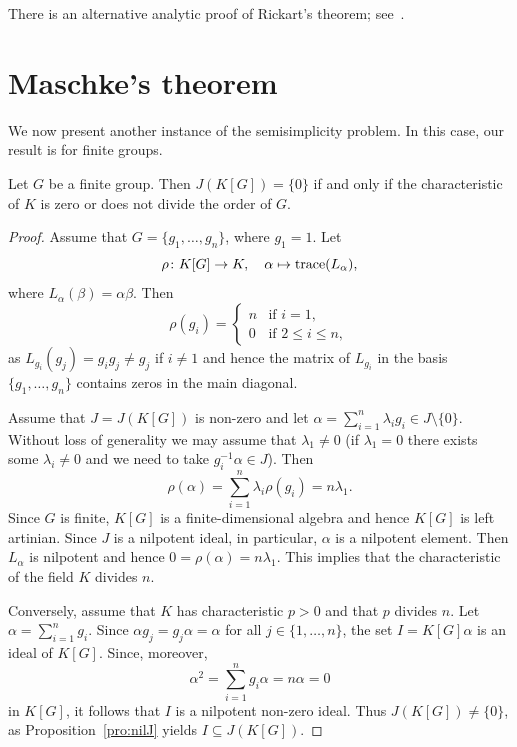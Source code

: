 
\project
There is an alternative analytic 
proof of Rickart's theorem; see~\cite{MR1838439}.

\section{Maschke's theorem}
\lecture 

We now present another instance of the semisimplicity problem.
In this case, our result is for finite groups. 

\begin{theorem}[Maschke]
	Let $G$ be a finite group. Then $J(K[G])=\{0\}$ if and only 
	if the characteristic of $K$ is zero 
	or does not divide the order of $G$. 
\end{theorem}

\begin{proof}
	Assume that $G=\{g_1,\dots,g_n\}$, where $g_1=1$. Let 
	\[
	\rho\colon K[G]\to K,
	\quad
	\alpha\mapsto\operatorname{trace}(L_{\alpha}),
	\]
	where 
	$L_{\alpha}(\beta)=\alpha\beta$. Then 
	\[
	\rho(g_i)=\begin{cases}
	    n & \text{if $i=1$,}\\
	    0 & \text{if $2\leq i\leq n$},
	\end{cases}
	\]
	as $L_{g_i}(g_j)=g_{i}g_j\ne g_j$ if $i\ne 1$ and hence the matrix of 
	$L_{g_i}$ in the basis $\{g_1,\dots,g_n\}$ contains zeros in the main diagonal.

	Assume that $J=J(K[G])$ is non-zero and let 
	$\alpha=\sum_{i=1}^n\lambda_ig_i\in J\setminus\{0\}$. Without loss of generality
	we may assume that $\lambda_1\ne 0$ (if $\lambda_1=0$ there exists some 
	$\lambda_i\ne 0$ and we need to take $g_i^{-1}\alpha\in J$). Then 
	\[
		\rho(\alpha)=\sum_{i=1}^n \lambda_i\rho(g_i)=n\lambda_1.
	\]
	Since $G$ is finite, $K[G]$ is a finite-dimensional algebra and hence 
	$K[G]$ is left artinian. Since $J$ is a nilpotent ideal, 
	in particular, $\alpha$ is a nilpotent element. Then 
	$L_{\alpha}$ is nilpotent and hence $0=\rho(\alpha)=n\lambda_1$. This implies that
	the characteristic of the field $K$ divides $n$. 

	Conversely, assume that $K$ has characteristic $p>0$ and that $p$ divides $n$.
	Let $\alpha=\sum_{i=1}^ng_i$. Since $\alpha
	g_j=g_j\alpha=\alpha$ for all $j\in\{1,\dots,n\}$, the set 
	$I=K[G]\alpha$ is an ideal of $K[G]$. Since, moreover,   
	\[
		\alpha^2=\sum_{i=1}^n g_i\alpha=n\alpha=0
	\]
	in $K[G]$, it follows that $I$ is a nilpotent non-zero ideal. Thus $J(K[G])\ne\{0\}$, 
	as Proposition~\ref{pro:nilJ} yields $I\subseteq J(K[G])$.
\end{proof}


